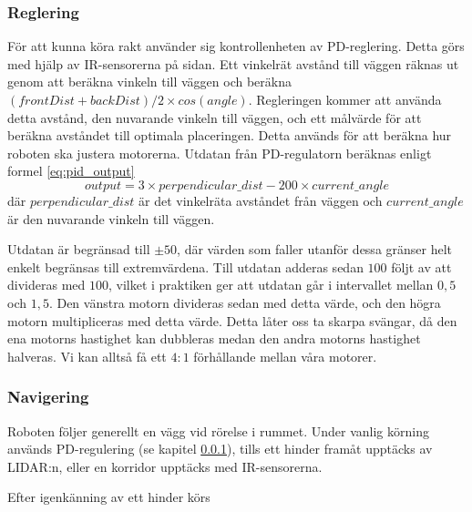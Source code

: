 \documentclass[a4paper,11pt]{article}
\begin{document}
\subsubsection{Reglering}
\label{sec:pid}

För att kunna köra rakt använder sig kontrollenheten av PD-reglering. Detta görs med hjälp av IR-sensorerna på sidan. Ett vinkelrät avstånd till väggen räknas ut genom att beräkna vinkeln till väggen och beräkna $ (frontDist+backDist)/2 \times cos(angle)$. Regleringen kommer att använda detta avstånd, den nuvarande vinkeln till väggen, och ett målvärde för att beräkna avståndet till optimala placeringen. Detta används för att beräkna hur roboten ska justera motorerna. Utdatan från PD-regulatorn beräknas enligt formel \ref{eq:pid_output}
\begin{equation}\label{eq:pid_output}
output = 3 \times perpendicular\_dist - 200 \times current\_angle
\end{equation}
där $perpendicular\_dist$ är det vinkelräta avståndet från väggen och $current\_angle$ är den nuvarande vinkeln till väggen.

Utdatan är begränsad till $\pm 50$, där värden som faller utanför dessa gränser helt enkelt begränsas till extremvärdena. Till utdatan adderas sedan $100$ följt av att divideras med $100$, vilket i praktiken ger att utdatan går i intervallet mellan $0,5$ och $1,5$. Den vänstra motorn divideras sedan med detta värde, och den högra motorn multipliceras med detta värde. Detta låter oss ta skarpa svängar, då den ena motorns hastighet kan dubbleras medan den andra motorns hastighet halveras. Vi kan alltså få ett $4:1$ förhållande mellan våra motorer.

\subsubsection{Navigering}
Roboten följer generellt en vägg vid rörelse i rummet. Under vanlig körning används PD-regulering (se kapitel \ref{sec:pid}), tills ett hinder framåt upptäcks av LIDAR:n, eller en korridor upptäcks med IR-sensorerna. 

Efter igenkänning av ett hinder körs 
\end{document}
